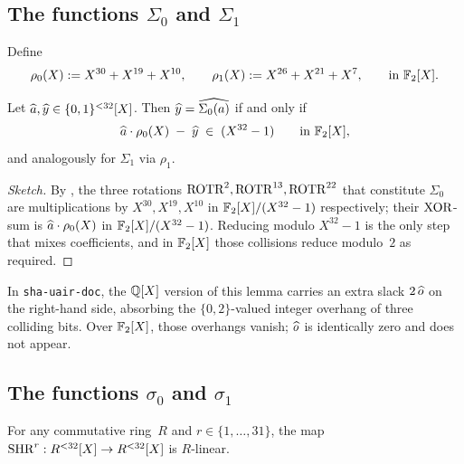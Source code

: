 \subsection{The functions $\Sigma_0$ and $\Sigma_1$}\label{sec:big-sigma}

Define
\begin{equation}\label{eq:rho}
\rho_{0}(X) := X^{30} + X^{19} + X^{10}, \qquad
\rho_{1}(X) := X^{26} + X^{21} + X^{7}, \qquad \text{in } \mathbb{F}_2[X].
\end{equation}

\begin{lemma}\label{lem:big-sigma}
Let $\widehat{a}, \widehat{y} \in \{0,1\}^{<32}[X]$. Then $\widehat{y} = \widehat{\Sigma_0(a)}$
if and only if
\begin{equation}\label{eq:sig0}
\widehat{a} \cdot \rho_0(X) \;-\; \widehat{y} \;\in\; (X^{32}-1) \qquad \text{in } \mathbb{F}_2[X],
\end{equation}
and analogously for $\Sigma_1$ via $\rho_1$.
\end{lemma}

\begin{proof}[Sketch]
By , the three rotations
$\operatorname{ROTR}^{2}, \operatorname{ROTR}^{13}, \operatorname{ROTR}^{22}$ that constitute $\Sigma_0$ are
multiplications by $X^{30}, X^{19}, X^{10}$ in $\mathbb{F}_2[X]/(X^{32}-1)$ respectively;
their $\operatorname{XOR}$-sum is $\widehat{a} \cdot \rho_0(X)$ in $\mathbb{F}_2[X]/(X^{32}-1)$. Reducing
modulo $X^{32}-1$ is the only step that mixes coefficients, and in
$\mathbb{F}_2[X]$ those collisions reduce modulo~$2$ as required.
\end{proof}

\begin{remark}\label{rem:no-overflow}
In \texttt{sha-uair-doc}, the $\mathbb{Q}[X]$ version of this lemma carries an
extra slack $2\,\widehat{o}$ on the right-hand side, absorbing the
$\{0,2\}$-valued integer overhang of three colliding bits. Over
$\mathbb{F}_2[X]$, those overhangs vanish; $\widehat{o}$ is identically zero and
does not appear.
\end{remark}

\subsection{The functions $\sigma_0$ and $\sigma_1$}\label{sec:small-sigma}

\begin{lemma}\label{lem:shr-virtual}
For any commutative ring~$R$ and $r \in \{1,\dots,31\}$, the map
$\operatorname{SHR}^r: R^{<32}[X] \to R^{<32}[X]$ is $R$-linear.
\end{lemma}


